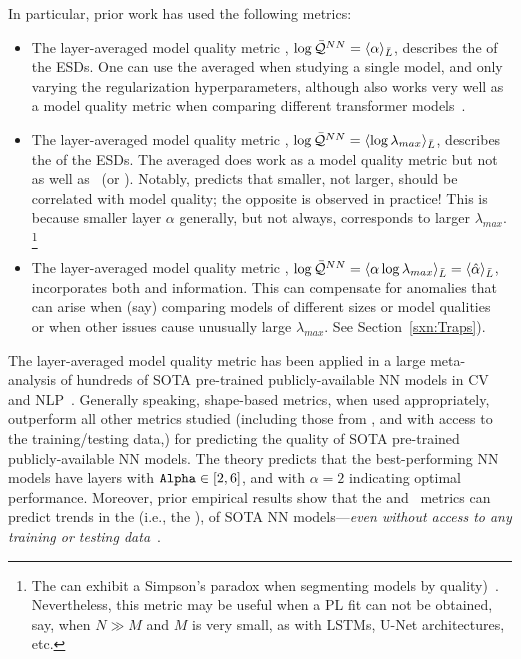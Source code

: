 In particular, prior work has used the following metrics:
\begin{itemize}
\item
The layer-averaged model quality metric \ALPHA, $\log\bar{\mathcal{Q}}^{NN}=\langle\alpha\rangle_{\bar{L}}$, describes the \SHAPE of the ESDs.
One can use the averaged \ALPHA when studying a single model, and only varying the regularization hyperparameters, although \ALPHA also works very well as a model quality metric when comparing different transformer models~\cite{YHTx21_TR}.
\item
The layer-averaged model quality metric \LOGSPECTRALNORM, $\log\bar{\mathcal{Q}}^{NN}=\langle\log\lambda_{max}\rangle_{\bar{L}}$, describes the \SCALE of the ESDs.
The averaged \LOGSPECTRALNORM does work as a model quality metric but not as well as \ALPHA~(or \ALPHAHAT).
Notably, \SLT predicts that smaller, not larger, \LOGSPECTRALNORM should be correlated with model quality; the opposite is observed in practice!
This is because smaller layer $\alpha$ generally, but not always, corresponds to larger $\lambda_{max}$.%
\footnote{The \LOGSPECTRALNORM can exhibit a Simpson's paradox when segmenting models by quality)~\cite{MM21a_simpsons_TR}.  Nevertheless, this metric may be useful when a PL fit can not be obtained, say, when $N\gg M$ and $M$ is very small, as with LSTMs,  U-Net architectures, etc.}
\item
The layer-averaged model quality metric \ALPHAHAT, $\log\bar{\mathcal{Q}}^{NN}=\langle\alpha\log\lambda_{max}\rangle_{\bar{L}}=\langle\hat{\alpha}\rangle_{\bar{L}}$, incorporates both \SHAPE and \SCALE information.
This can compensate for anomalies that can arise when (say) comparing models of different sizes or model qualities~\cite{MM21a_simpsons_TR} or when other issues cause unusually large $\lambda_{max}$. See Section~\ref{sxn:Traps}).
\end{itemize}

\noindent
The layer-averaged \ALPHAHAT model quality metric has been applied in a large meta-analysis of hundreds of SOTA 
pre-trained publicly-available NN models in CV and NLP~\cite{MM20a_trends_NatComm,YTHx22_TR,YTHx23_KDD,MM19a_TR}. 
%
Generally speaking, \HTSR shape-based metrics, when used appropriately, outperform all other metrics studied (including 
those from \SLT, and with access to the training/testing data,) for predicting the quality of SOTA pre-trained publicly-available NN models.  
%
The \HTSR theory predicts that the best-performing NN models have layers with $\texttt{Alpha}\in[2,6]$, and with $\alpha=2$
indicating optimal performance.
Moreover, prior empirical results show that the \ALPHA and \ALPHAHAT~metrics can predict trends in the \Quality 
(i.e., the \GeneralizationAccuracy), of SOTA NN models---\emph{even without access to any training or testing data}~\cite{MM20a_trends_NatComm}.



